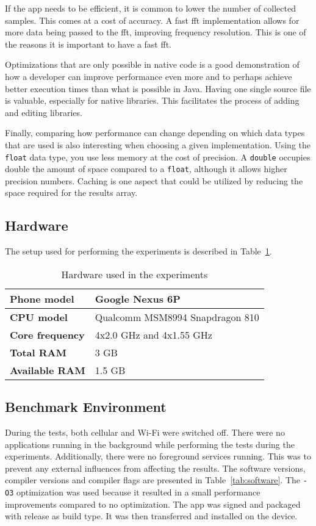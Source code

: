If the app needs to be efficient, it is common to lower the number of collected samples. This comes at a cost of accuracy. A fast \gls{fft} implementation allows for more data being passed to the \gls{fft}, improving frequency resolution. This is one of the reasons it is important to have a fast \gls{fft}.

Optimizations that are only possible in native code is a good demonstration of how a developer can improve performance even more and to perhaps achieve better execution times than what is possible in Java. Having one single source file is valuable, especially for native libraries. This facilitates the process of adding and editing libraries.

Finally, comparing how performance can change depending on which data types that are used is also interesting when choosing a given implementation. Using the \texttt{float} data type, you use less memory at the cost of precision. A \texttt{double} occupies double the amount of space compared to a \texttt{float}, although it allows higher precision numbers. Caching is one aspect that could be utilized by reducing the space required for the results array.

\subsection{Hardware}
The setup used for performing the experiments is described in Table~\ref{tab:hardware}.

\ifrelease
\begin{table}[H]
    \centering
    \caption{Hardware used in the experiments}
    \label{tab:hardware}
    \begin{tabular}{|l|l|}
        \hline
        \textbf{Phone model} & Google Nexus 6P\\
        \hline
        \textbf{CPU model} & Qualcomm MSM8994 Snapdragon 810\\
        \hline
        \textbf{Core frequency} & 4x2.0 GHz and 4x1.55 GHz\\
        \hline
        \textbf{Total RAM} & 3 GB\\
        \hline
        \textbf{Available RAM} & 1.5 GB\\
        \hline
    \end{tabular}
\end{table}
\fi


\subsection{Benchmark Environment}
During the tests, both cellular and Wi-Fi were switched off. There were no applications running in the background while performing the tests during the experiments. Additionally, there were no foreground services running. This was to prevent any external influences from affecting the results. The software versions, compiler versions and compiler flags are presented in Table~\ref{tab:software}. The \texttt{-O3} optimization was used because it resulted in a small performance improvements compared to no optimization. The app was signed and packaged with release as build type. It was then transferred and installed on the device.

